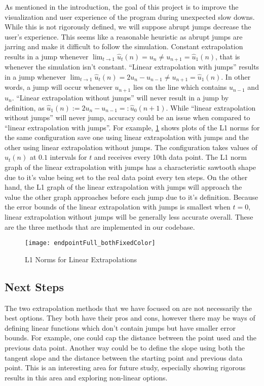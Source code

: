 As mentioned in the introduction, the goal of this project is to improve the visualization and user experience of the program during unexpected slow downs.
While this is not rigorously defined, we will suppose abrupt jumps decrease the user's experience.
This seems like a reasonable heuristic as abrupt jumps are jarring and make it difficult to follow the simulation.
Constant extrapolation results in a jump whenever $\lim_{t\to1}\hat{u}_t(n) = u_n \not= u_{n+1} = \hat{u}_1(n)$, that is whenever the simulation isn't constant.
``Linear extrapolation with jumps'' results in a jump whenever $\lim_{t\to1}\hat{u}_t(n) = 2u_n - u_{n-1} \not= u_{n+1} = \hat{u}_1(n)$.
In other words, a jump will occur whenever $u_{n+1}$ lies on the line which contains $u_{n-1}$ and $u_n$.
``Linear extrapolation without jumps'' will never result in a jump by definition, as $\hat{u}_1(n) := 2u_n - u_{n-1} =: \hat{u}_0(n+1)$.
While ``linear extrapolation without jumps'' will never jump, accuracy could be an issue when compared to ``linear extrapolation with jumps''.
For example, \cref{fig:l1} shows plots of the L1 norms for the same configuration save one using linear extrapolation with jumps and the other using linear extrapolation without jumps.
The configuration takes values of $\hat{u}_t(n)$ at $0.1$ intervals for $t$ and receives every 10th data point.
The L1 norm graph of the linear extrapolation with jumps has a characteristic sawtooth shape due to it's value being set to the real data point every ten steps.
On the other hand, the L1 graph of the linear extrapolation with jumps will approach the value the other graph approaches before each jump due to it's definition.
Because the error bounds of the linear extrapolation with jumps is smallest when $t=0$, linear extrapolation without jumps will be generally less accurate overall.
These are the three methods that are implemented in our codebase.

\begin{figure}[H]
    \centering
    \texttt{[image: endpointFull\_bothFixedColor]}
    \caption{L1 Norms for Linear Extrapolations}%
    \label{fig:l1}
\end{figure}


\subsection{Next Steps}%
\label{sub:next_steps}

The two extrapolation methods that we have focused on are not necessarily the best options.
They both have their pros and cons, however there may be ways of defining linear functions which don't contain jumps but have smaller error bounds.
For example, one could cap the distance between the point used and the previous data point.
Another way could be to define the slope using both the tangent slope and the distance between the starting point and previous data point.
This is an interesting area for future study, especially showing rigorous results in this area and exploring non-linear options.
